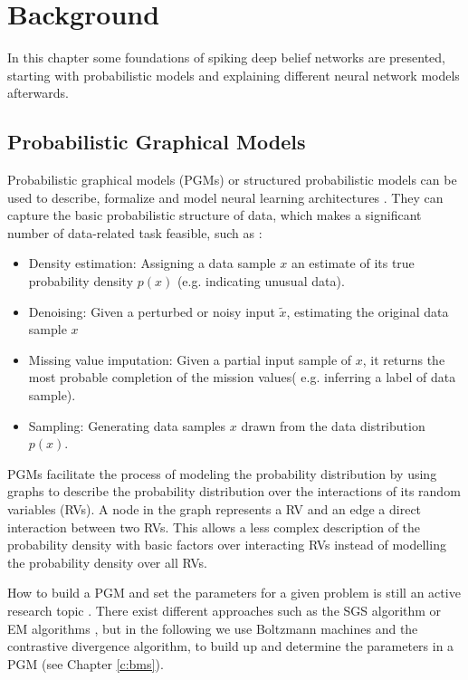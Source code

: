 \chapter{Background} \label{c:backgrnd}

In this chapter some foundations of spiking deep belief networks are presented, starting with probabilistic models and explaining different neural network models afterwards.

\section{Probabilistic Graphical Models} \label{c:pgms}

Probabilistic graphical models (PGMs) or structured probabilistic models can be used to describe, formalize and model neural learning architectures \cite{Goodfellow-et-al-2016-Book} \cite{Petrovici2016}.
They can capture the basic probabilistic structure of data, which makes a significant number of data-related task feasible, such as \cite{Goodfellow-et-al-2016-Book}:
\begin{itemize}

\item Density estimation: Assigning a data sample $x$ an estimate of its true probability density $p(x)$ (e.g. indicating unusual data).

\item Denoising: Given a perturbed or noisy input $\widetilde{x}$,  estimating the original data sample $x$

\item Missing value imputation: Given a partial input sample of $x$, it returns the most probable completion of the mission values( e.g. inferring a label of data sample).

\item Sampling: Generating data samples $x$ drawn from the data distribution $p(x)$. 

\end{itemize}  

PGMs facilitate the process of modeling the probability distribution by using graphs to describe the probability distribution over the interactions of its random variables (RVs).
A node in the graph represents a RV and an edge a direct interaction between two RVs.
This allows a less complex description of the probability density with basic factors over interacting RVs instead of modelling the probability density over all RVs. 

How to build a PGM and set the parameters for a given problem is still an active research topic \cite{Ghahramani2002}\cite{Zhou2007}.
There exist different approaches such as the SGS algorithm \cite{Zhou2007} or EM algorithms \cite{Ghahramani2002}, but in the following we use Boltzmann machines and the contrastive divergence algorithm, to build up and determine the parameters in a PGM (see Chapter \ref{c:bms}).

